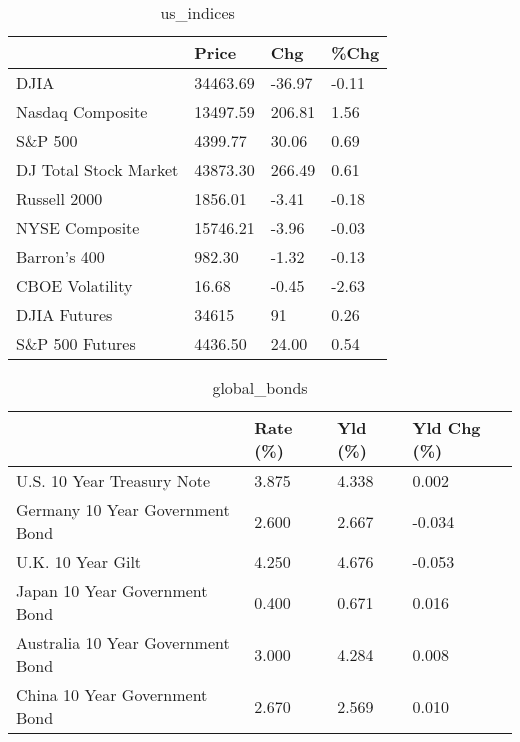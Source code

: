 \documentclass{article}%
\begin{document}
%


\begin{table}[htbp]%
\caption{us\_indices}%
\centering%
\begin{adjustbox}{width=1\textwidth}%
\begin{tabular}{llll}
\toprule
                      &    Price &    Chg &  \%Chg \\
\midrule
                 DJIA & 34463.69 & -36.97 & -0.11 \\
     Nasdaq Composite & 13497.59 & 206.81 &  1.56 \\
              S\&P 500 &  4399.77 &  30.06 &  0.69 \\
DJ Total Stock Market & 43873.30 & 266.49 &  0.61 \\
         Russell 2000 &  1856.01 &  -3.41 & -0.18 \\
       NYSE Composite & 15746.21 &  -3.96 & -0.03 \\
         Barron's 400 &   982.30 &  -1.32 & -0.13 \\
      CBOE Volatility &    16.68 &  -0.45 & -2.63 \\
         DJIA Futures &    34615 &     91 &  0.26 \\
      S\&P 500 Futures &  4436.50 &  24.00 &  0.54 \\
\bottomrule
\end{tabular}
%
\end{adjustbox}%
\end{table}

%


\begin{table}[htbp]%
\caption{global\_bonds}%
\centering%
\begin{adjustbox}{width=1\textwidth}%
\begin{tabular}{llll}
\toprule
                                  & Rate (\%) & Yld (\%) & Yld Chg (\%) \\
\midrule
       U.S. 10 Year Treasury Note &    3.875 &   4.338 &       0.002 \\
  Germany 10 Year Government Bond &    2.600 &   2.667 &      -0.034 \\
                U.K. 10 Year Gilt &    4.250 &   4.676 &      -0.053 \\
    Japan 10 Year Government Bond &    0.400 &   0.671 &       0.016 \\
Australia 10 Year Government Bond &    3.000 &   4.284 &       0.008 \\
    China 10 Year Government Bond &    2.670 &   2.569 &       0.010 \\
\bottomrule
\end{tabular}
%
\end{adjustbox}%
\end{table}
\end{document}

